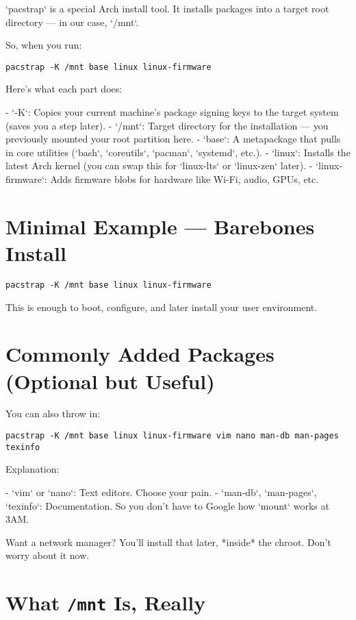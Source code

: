 \documentclass[12pt,openany]{book}
\begin{document}
`pacstrap` is a special Arch install tool. It installs packages into a target root directory — in our case, `/mnt`.

So, when you run:

\begin{lstlisting}
pacstrap -K /mnt base linux linux-firmware
\end{lstlisting}

Here’s what each part does:

- `-K`: Copies your current machine’s package signing keys to the target system (saves you a step later).
- `/mnt`: Target directory for the installation — you previously mounted your root partition here.
- `base`: A metapackage that pulls in core utilities (`bash`, `coreutils`, `pacman`, `systemd`, etc.).
- `linux`: Installs the latest Arch kernel (you can swap this for `linux-lts` or `linux-zen` later).
- `linux-firmware`: Adds firmware blobs for hardware like Wi-Fi, audio, GPUs, etc.

\section{Minimal Example — Barebones Install}

\begin{lstlisting}
pacstrap -K /mnt base linux linux-firmware
\end{lstlisting}

This is enough to boot, configure, and later install your user environment.

\section{Commonly Added Packages (Optional but Useful)}

You can also throw in:

\begin{lstlisting}
pacstrap -K /mnt base linux linux-firmware vim nano man-db man-pages texinfo
\end{lstlisting}

Explanation:

- `vim` or `nano`: Text editors. Choose your pain.
- `man-db`, `man-pages`, `texinfo`: Documentation. So you don’t have to Google how `mount` works at 3AM.

Want a network manager? You’ll install that later, *inside* the chroot. Don’t worry about it now.

\section{What \texttt{/mnt} Is, Really}
\end{document}
